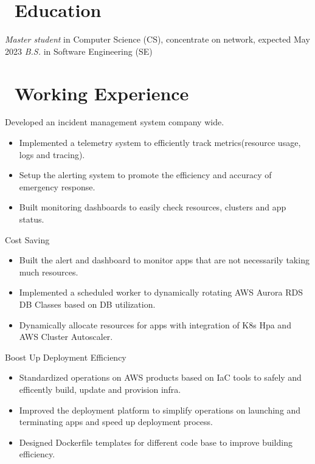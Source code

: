 \documentclass{resume}
\begin{document}



\section{\faGraduationCap\ Education}
\textit{Master student} in Computer Science (CS), concentrate on network, expected May 2023
\textit{B.S.} in Software Engineering (SE)

\section{\faUsers\ Working Experience}
Developed an incident management system company wide.
\begin{itemize}
  \item Implemented a telemetry system to efficiently track metrics(resource usage, logs and tracing).
  \item Setup the alerting system to promote the efficiency and accuracy of emergency response.
  \item Built monitoring dashboards to easily check resources, clusters and app status.
\end{itemize}

Cost Saving
\begin{itemize}
  \item Built the alert and dashboard to monitor apps that are not necessarily taking much resources.
  \item Implemented a scheduled worker to dynamically rotating AWS Aurora RDS DB Classes based on DB utilization.
  \item Dynamically allocate resources for apps with integration of K8s Hpa and AWS Cluster Autoscaler.
\end{itemize}

Boost Up Deployment Efficiency
\begin{itemize}
  \item Standardized operations on AWS products based on IaC tools to safely and efficently build, update and provision infra.
  \item Improved the deployment platform to simplify operations on launching and terminating apps and speed up deployment process.
  \item Designed Dockerfile templates for different code base to improve building efficiency.
\end{itemize}
\end{document}
